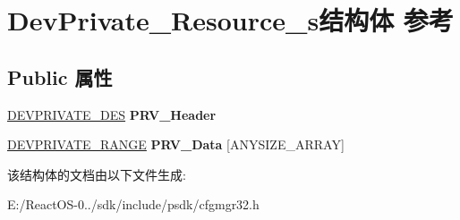 \hypertarget{struct_dev_private___resource__s}{}\section{Dev\+Private\+\_\+\+Resource\+\_\+s结构体 参考}
\label{struct_dev_private___resource__s}
\subsection*{Public 属性}
\begin{DoxyCompactItemize}
\item 
\mbox{\label{struct_dev_private___resource__s_ae9bd5d9752139da935a4d18c48f4d800}} 
\hyperlink{struct_dev_private___des__s}{D\+E\+V\+P\+R\+I\+V\+A\+T\+E\+\_\+\+D\+ES} {\bfseries P\+R\+V\+\_\+\+Header}
\item 
\mbox{\label{struct_dev_private___resource__s_a471abb4f35520faef0759e04904eba56}} 
\hyperlink{struct_dev_private___range__s}{D\+E\+V\+P\+R\+I\+V\+A\+T\+E\+\_\+\+R\+A\+N\+GE} {\bfseries P\+R\+V\+\_\+\+Data} \mbox{[}A\+N\+Y\+S\+I\+Z\+E\+\_\+\+A\+R\+R\+AY\mbox{]}
\end{DoxyCompactItemize}


该结构体的文档由以下文件生成\+:\begin{DoxyCompactItemize}
\item 
E\+:/\+React\+O\+S-\/0../sdk/include/psdk/cfgmgr32.\+h\end{DoxyCompactItemize}
